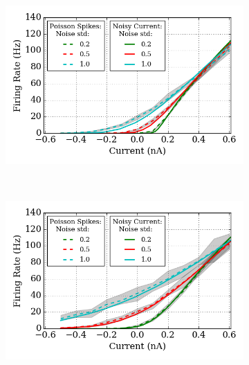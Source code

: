 	\DIFaddbegin \begin{figure}[tbp!]
		\centering
		\begin{subfigure}[t]{0.7\textwidth}
			\includegraphics[width=\textwidth]{pics_iconip/revise_spike_curve-1.png}
			\caption{}
		\end{subfigure}\\
		\begin{subfigure}[t]{0.7\textwidth}
			\includegraphics[width=\textwidth]{pics_iconip/revise_spike_curve-2.png}
			\caption{}
		\end{subfigure}

\end{figure}
